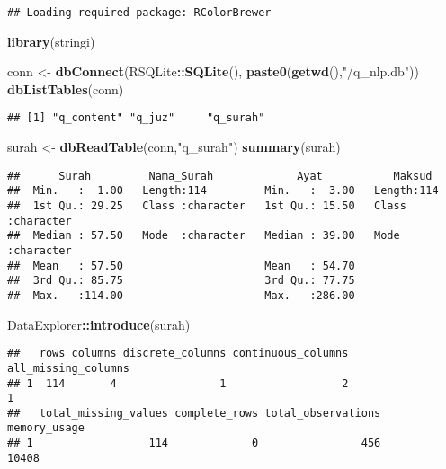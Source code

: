 \documentclass[]{article}
\newenvironment{Shaded}{\begin{snugshade}}{\end{snugshade}}
\newcommand{\KeywordTok}[1]{\textcolor[rgb]{0.13,0.29,0.53}{\textbf{#1}}}
\newcommand{\NormalTok}[1]{#1}
\newcommand{\OperatorTok}[1]{\textcolor[rgb]{0.81,0.36,0.00}{\textbf{#1}}}
\newcommand{\StringTok}[1]{\textcolor[rgb]{0.31,0.60,0.02}{#1}}
\begin{document}
\begin{verbatim}
## Loading required package: RColorBrewer
\end{verbatim}

\begin{Shaded}
\begin{Highlighting}[]
\KeywordTok{library}\NormalTok{(stringi)}

\NormalTok{conn <-}\StringTok{ }\KeywordTok{dbConnect}\NormalTok{(RSQLite}\OperatorTok{::}\KeywordTok{SQLite}\NormalTok{(),  }\KeywordTok{paste0}\NormalTok{(}\KeywordTok{getwd}\NormalTok{(),}\StringTok{"/q_nlp.db"}\NormalTok{))}
\KeywordTok{dbListTables}\NormalTok{(conn)}
\end{Highlighting}
\end{Shaded}

\begin{verbatim}
## [1] "q_content" "q_juz"     "q_surah"
\end{verbatim}

\begin{Shaded}
\begin{Highlighting}[]
\NormalTok{surah <-}\StringTok{ }\KeywordTok{dbReadTable}\NormalTok{(conn,}\StringTok{"q_surah"}\NormalTok{)}
\KeywordTok{summary}\NormalTok{(surah)}
\end{Highlighting}
\end{Shaded}

\begin{verbatim}
##      Surah         Nama_Surah             Ayat           Maksud         
##  Min.   :  1.00   Length:114         Min.   :  3.00   Length:114        
##  1st Qu.: 29.25   Class :character   1st Qu.: 15.50   Class :character  
##  Median : 57.50   Mode  :character   Median : 39.00   Mode  :character  
##  Mean   : 57.50                      Mean   : 54.70                     
##  3rd Qu.: 85.75                      3rd Qu.: 77.75                     
##  Max.   :114.00                      Max.   :286.00
\end{verbatim}

\begin{Shaded}
\begin{Highlighting}[]
\NormalTok{DataExplorer}\OperatorTok{::}\KeywordTok{introduce}\NormalTok{(surah)}
\end{Highlighting}
\end{Shaded}

\begin{verbatim}
##   rows columns discrete_columns continuous_columns all_missing_columns
## 1  114       4                1                  2                   1
##   total_missing_values complete_rows total_observations memory_usage
## 1                  114             0                456        10408
\end{verbatim}
\end{document}
